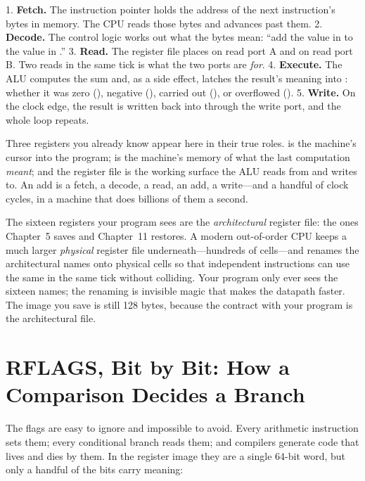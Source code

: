 1. \textbf{Fetch.} The instruction pointer  holds the
address of the next instruction's bytes in memory. The CPU reads
those bytes and advances  past them.
2. \textbf{Decode.} The control logic works out what the bytes mean:
``add the value in  to the value in .''
3. \textbf{Read.} The register file places  on read port
A and  on read port B. Two reads in the same tick is what
the two ports are \emph{for}.
4. \textbf{Execute.} The ALU computes the sum and, as a side effect,
latches the result's meaning into : whether it was zero
(), negative (), carried out (), or
overflowed ().
5. \textbf{Write.} On the clock edge, the result is written back
into  through the write port, and the whole loop repeats.

Three registers you already know appear here in their true roles.
 is the machine's cursor into the program; 
is the machine's memory of what the last computation \emph{meant};
and the register file is the working surface the ALU reads from and
writes to. An add is a fetch, a decode, a read, an add, a write---and
a handful of clock cycles, in a machine that does billions of them a
second.

\begin{insight}
The sixteen registers your program sees are the \emph{architectural}
register file: the ones Chapter~5 saves and Chapter~11 restores. A
modern out-of-order CPU keeps a much larger \emph{physical} register
file underneath---hundreds of cells---and renames the architectural
names onto physical cells so that independent instructions can use
the same  in the same tick without colliding. Your program
only ever sees the sixteen names; the renaming is invisible magic
that makes the datapath faster. The image you save is still 128
bytes, because the contract with your program is the architectural
file.
\end{insight}

\section{RFLAGS, Bit by Bit: How a Comparison Decides a Branch}
\label{sec:rflags}

The flags are easy to ignore and impossible to avoid. Every
arithmetic instruction sets them; every conditional branch reads
them; and compilers generate code that lives and dies by them. In the
register image they are a single 64-bit word, but only a handful of
the bits carry meaning:

